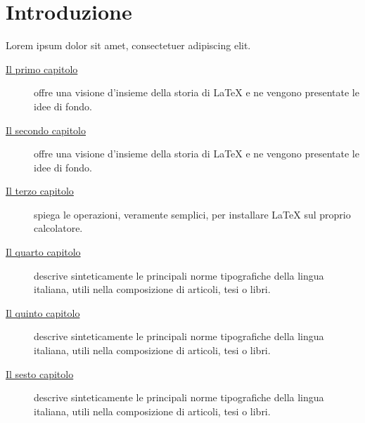 
\cleardoublepage
{}

\chapter*{Introduzione}

\lipsum[1]

Lorem ipsum dolor sit amet, consectetuer adipiscing elit.

\begin{description}
\item[{\hyperref[cap:intro]{Il primo capitolo}}]
offre una visione d'insieme della storia di \LaTeX{} e ne vengono presentate le idee di fondo.
\item[{\hyperref[cap:ctbn]{Il secondo capitolo}}]
offre una visione d'insieme della storia di \LaTeX{} e ne vengono presentate le idee di fondo.
\item[{\hyperref[cap:ctbnc]{Il terzo capitolo}}]
spiega le operazioni, veramente semplici, per installare \LaTeX{} sul proprio calcolatore.
\item[{\hyperref[cap:r]{Il quarto capitolo}}]
descrive sinteticamente le principali norme tipografiche della lingua italiana, utili nella composizione di articoli, tesi o libri.
\item[{\hyperref[cap:esperimenti]{Il quinto capitolo}}]
descrive sinteticamente le principali norme tipografiche della lingua italiana, utili nella composizione di articoli, tesi o libri.
\item[{\hyperref[cap:concl]{Il sesto capitolo}}]
descrive sinteticamente le principali norme tipografiche della lingua italiana, utili nella composizione di articoli, tesi o libri.
\end{description}

